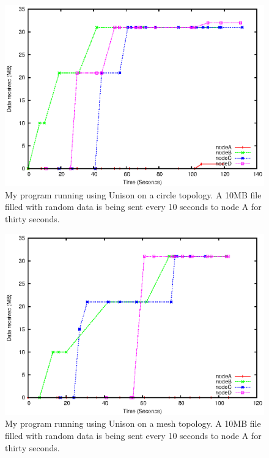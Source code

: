 \documentclass[12pt]{article}
\begin{document}
\begin{figure}[hb!]
    \centering
    \includegraphics[height=0.5\textheight]{images/circ-uni-almost.eps}
    \caption{My program running using Unison on a circle topology.
    A 10MB file filled with random
    data is being sent every 10 seconds to node A for thirty seconds.}
    \label{fig:full_circ_uni}
\end{figure}
\begin{figure}[ht!]
    \centering
    \includegraphics[height=0.5\textheight]{images/mesh-uni-almost.eps}
    \caption{My program running using Unison on a mesh topology.
    A 10MB file filled with random
    data is being sent every 10 seconds to node A for thirty seconds.}
    \label{fig:full_mesh_uni}
\end{figure}

\newpage
\end{document}
